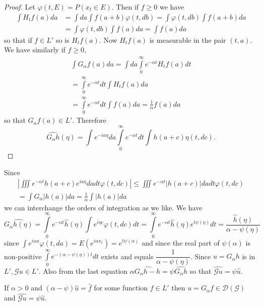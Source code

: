 \begin{proof}
  Let $\varphi (t, E) = P(x_t \in E)$. Then if $f \geq 0$ we have 
  \begin{align*}
    \int H_t f(a) da & = \int da \int f(a+b) \varphi (t, db) = \int
    \varphi (t, db) \int f(a+b) da\\ 
    & = \int \varphi (t, db) \int f(a) da = \int f(a) da
  \end{align*}
  so that if $f \in L'$ so is $H_t f(a)$. Now $H_t f(a)$ is measurable
  in the pair $(t, a)$. We have similarly if $f \geq 0$, 
\begin{multline*}
\int G_{\alpha} f(a) da = \int da \int\limits^{\infty}_0 e^{-\alpha
    t} H_t f(a) dt\\ 
  = \int\limits^{\infty}_0 e^{-\alpha t} dt
 \int H_{t} f (a) da\\
 = \int\limits^{\infty}_{0}e^{-\alpha t}dt\int f(a)da=\frac{1}{\alpha}
 f(a) da  
\end{multline*}
so that $G_{\alpha} f(a) \in L'$. Therefore 
$$
\widehat{G_{\alpha} h} (\eta) = \int e^{-ia \eta} da \int
\limits^{\infty}_0 e^{- \alpha t} dt \int h(a+c) \eta (t, dc). 
$$
\end{proof}

Since
\begin{gather*}
  \left| \iiint e^{-\alpha t} h (a+c) e^{i a \eta} da dt \varphi (t,
  dc) \right| \leq \iiint e^{- \alpha t}|h(a+c) | da dt \varphi (t,
  dc)\\ 
  = \int G_{\alpha}|h(a) | da = \frac{1}{\alpha} \int |h (a)| da
\end{gather*}
we can interchange the orders of integration as we like. We have
$$
\widehat{G_{\alpha} h (\eta)} = \int\limits^{\infty}_0 e^{-\alpha t}
\hat{h}(\eta) \int e^{i \eta c} \varphi (t, dc) dt = \int \limits^{\infty}_0
e^{-\alpha t} \hat{h}(\eta) e^{t \psi (\eta)} dt =
\frac{\hat{h}(\eta)}{\alpha - \psi (\eta)}
$$\pageoriginale
since $\int e^{i \alpha a}
\varphi (t, da) = E(e^{i \alpha x_t}) = e^{t \psi (\alpha)}$ and since
the real part of $\psi(\alpha)$ is non-positive $\int
\limits^{\infty}_0 e^{-(\alpha- \psi (\eta))t}dt$ exists and equals
$\dfrac{1}{\alpha - \psi(\eta)}$. Since $u = G_{\alpha} h$ is in $L',
\mathscr{G} u \in L'$. Also from the last equation $\alpha
\widehat{G_{\alpha} h - h} = \psi \widehat{G_{\alpha} h}$ so that
$\widehat{\mathscr{G}u} = \psi \hat{u}$.
 
\begin{coro*}
  If $\alpha > 0$ and $(\alpha - \psi) \hat{u}  = \hat{f}$ for
  some function $f \in L'$ then $u = G_{\alpha} f \in \mathscr{D}
  (\mathscr{G})$ and $\widehat{\mathscr{G} u} = \psi \hat{u}$. 
\end{coro*}

